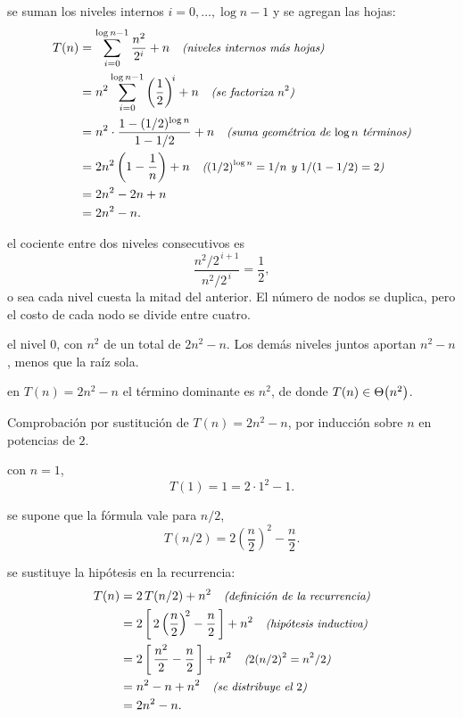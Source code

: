 \documentclass[11pt,letterpaper]{article}
\begin{document}
 se suman los niveles internos $i = 0, \dots,
\log n - 1$ y se agregan las hojas:
\begin{align*}
  T(n) &= \sum_{i=0}^{\log n - 1} \frac{n^{2}}{2^{i}} + n
          \quad\text{\small\itshape (niveles internos más hojas)} \\
       &= n^{2} \sum_{i=0}^{\log n - 1}
          \left(\frac{1}{2}\right)^{\!i} + n
          \quad\text{\small\itshape (se factoriza $n^{2}$)} \\
       &= n^{2} \cdot \frac{1 - (1/2)^{\log n}}{1 - 1/2} + n
          \quad\text{\small\itshape (suma geométrica de $\log n$ términos)} \\
       &= 2n^{2}\left(1 - \frac{1}{n}\right) + n
          \quad\text{\small\itshape ($(1/2)^{\log n} = 1/n$ y $1/(1 - 1/2) = 2$)} \\
       &= 2n^{2} - 2n + n \\
       &= 2n^{2} - n.
\end{align*}

 el cociente
entre dos niveles consecutivos es
\[
  \frac{n^{2}/2^{\,i+1}}{n^{2}/2^{\,i}} = \frac{1}{2},
\]
o sea cada nivel cuesta la mitad del anterior. El número de nodos se
duplica, pero el costo de cada nodo se divide entre cuatro.

 el nivel $0$, con
$n^{2}$ de un total de $2n^{2} - n$. Los demás niveles juntos aportan
$n^{2} - n$, menos que la raíz sola.

 en $T(n) = 2n^{2} - n$ el término
dominante es $n^{2}$, de donde $T(n) \in \Theta\!\left(n^{2}\right)$.

Comprobación por sustitución de $T(n) = 2n^{2} - n$, por inducción
sobre $n$ en potencias de $2$.

 con $n = 1$,
\[
  T(1) = 1 = 2 \cdot 1^{2} - 1.
\]

 se supone que la fórmula vale para $n/2$,
\[
  T(n/2) = 2\left(\frac{n}{2}\right)^{\!2} - \frac{n}{2}.
\]

 se sustituye la hipótesis en la recurrencia:
\begin{align*}
  T(n) &= 2\,T(n/2) + n^{2}
          \quad\text{\small\itshape (definición de la recurrencia)} \\
       &= 2\left[\,2\left(\frac{n}{2}\right)^{\!2}
          - \frac{n}{2}\,\right] + n^{2}
          \quad\text{\small\itshape (hipótesis inductiva)} \\
       &= 2\left[\,\frac{n^{2}}{2} - \frac{n}{2}\,\right] + n^{2}
          \quad\text{\small\itshape ($2(n/2)^{2} = n^{2}/2$)} \\
       &= n^{2} - n + n^{2}
          \quad\text{\small\itshape (se distribuye el $2$)} \\
       &= 2n^{2} - n.
\end{align*}

\end{document}
